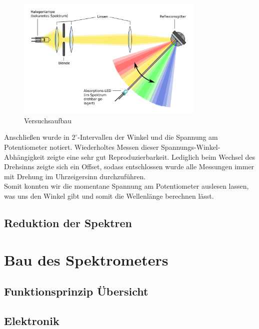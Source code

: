 \documentclass[11pt]{scrartcl}
\begin{document}
\begin{figure}[ht]
\begin{center}
\includegraphics[width=0.8\textwidth]{images/setup.jpg}
\end{center}
\vspace{-1.5\baselineskip}
\caption{Versuchsaufbau}
\label{Versuchsaufbau}
\end{figure}

Anschließen wurde in $2^\circ$-Intervallen der Winkel und die Spannung am Potentiometer notiert. Wiederholtes Messen dieser Spannungs-Winkel-Abhängigkeit zeigte eine sehr gut Reproduzierbarkeit. Lediglich beim Wechsel des Drehsinns zeigte sich ein Offset, sodass entschlossen wurde alle Messungen immer mit Drehung im Uhrzeigersinn durchzuführen.\\
Somit konnten wir die momentane Spannung am Potentiometer auslesen lassen, was uns den Winkel gibt und somit die Wellenlänge berechnen lässt.


\subsection{Reduktion der Spektren}





\section{Bau des Spektrometers}
\subsection{Funktionsprinzip Übersicht}

\subsection{Elektronik}
\end{document}
